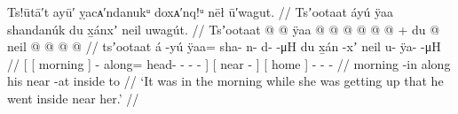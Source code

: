 
\ex\label{ex:94-12-while-waking-went-inside-near}%
%
\begingl
	\glpreamble	Ts!ūtā′t ayū′ ỵacᴀ′ndanukᵘ doxᴀ′nq!ᵘ nēł ū′wagut. //
	\glpreamble	Tsʼootaat áyú ÿaa shandanúk du x̱ánxʼ neil uwagút. //
	\gla	{} {} Tsʼootaat @ {} {}  @ {} 
			ÿaa @  @ {} @ {} @ {} @ {} @ {} {} +
		{} du  @ {} {}
		{} neil @ {} {}
		 @ {} @ {} @ {} //
	\glb	{} {} tsʼootaat {} {} á -yú
		ÿaa= sha- n- d-  -μH {} {}
		{} du x̱án -xʼ {}
		{} neil {} {}
		u- ÿa-  -μH //
	\glc	{}[ {}[ morning \· {}]  -
			along= head- - -  - \· {}]
		{}[  near - {}]
		{}[ home \· {}]
		- -  - //
	\gld	{} {} morning -in {} 
			along  {} {} {} {} {} {} {}
		{} his near -at {}
		{} inside \·to {}
		 {} {} {} //
	\glft	‘It was in the morning while she was getting up that he went inside near her.’
		//
\endgl
\xe

